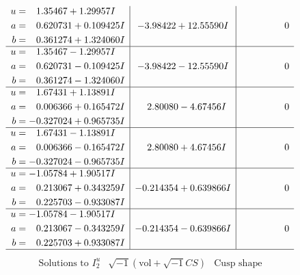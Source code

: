 \documentclass[1p]{elsarticle_modified}
\theoremstyle{definition}
\newcommand{\I}{\sqrt{-1}}
\begin{document}
$$\begin{array}{c|c|c}
\begin{aligned}
u &= \phantom{-}1.35467 + 1.29957 I \\
a &= \phantom{-}0.620731 + 0.109425 I \\
b &= \phantom{-}0.361274 + 1.324060 I\end{aligned}
 & -3.98422 + 12.55590 I & \phantom{-0.000000 } 0 \\ \hline\begin{aligned}
u &= \phantom{-}1.35467 - 1.29957 I \\
a &= \phantom{-}0.620731 - 0.109425 I \\
b &= \phantom{-}0.361274 - 1.324060 I\end{aligned}
 & -3.98422 - 12.55590 I & \phantom{-0.000000 } 0 \\ \hline\begin{aligned}
u &= \phantom{-}1.67431 + 1.13891 I \\
a &= \phantom{-}0.006366 + 0.165472 I \\
b &= -0.327024 + 0.965735 I\end{aligned}
 & \phantom{-}2.80080 - 4.67456 I & \phantom{-0.000000 } 0 \\ \hline\begin{aligned}
u &= \phantom{-}1.67431 - 1.13891 I \\
a &= \phantom{-}0.006366 - 0.165472 I \\
b &= -0.327024 - 0.965735 I\end{aligned}
 & \phantom{-}2.80080 + 4.67456 I & \phantom{-0.000000 } 0 \\ \hline\begin{aligned}
u &= -1.05784 + 1.90517 I \\
a &= \phantom{-}0.213067 + 0.343259 I \\
b &= \phantom{-}0.225703 - 0.933087 I\end{aligned}
 & -0.214354 + 0.639866 I & \phantom{-0.000000 } 0 \\ \hline\begin{aligned}
u &= -1.05784 - 1.90517 I \\
a &= \phantom{-}0.213067 - 0.343259 I \\
b &= \phantom{-}0.225703 + 0.933087 I\end{aligned}
 & -0.214354 - 0.639866 I & \phantom{-0.000000 } 0\\
 \hline 
 \end{array}$$\newpage$$\begin{array}{c|c|c}  
\text{Solutions to }I^u_{2}& \I (\text{vol} + \sqrt{-1}CS) & \text{Cusp shape}\\

\end{array}$$
\end{document}

